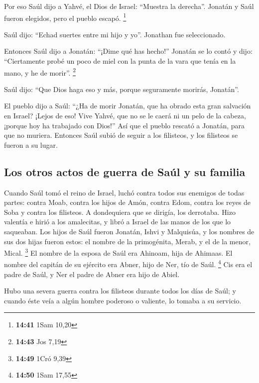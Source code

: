 \begin{paracol}{2}
 Por eso Saúl dijo a Yahvé, el Dios de Israel: ``Muestra
la derecha''. Jonatán y Saúl fueron elegidos, pero el pueblo escapó.
\footnote{\textbf{14:41} 1Sam 10,20}

 Saúl dijo: ``Echad suertes entre mi hijo y yo''.
Jonathan fue seleccionado.

 Entonces Saúl dijo a Jonatán: ``¡Dime qué has hecho!''
Jonatán se lo contó y dijo: ``Ciertamente probé un poco de miel con la
punta de la vara que tenía en la mano, y he de morir''. \footnote{\textbf{14:43}
  Jos 7,19}

 Saúl dijo: ``Que Dios haga eso y más, porque seguramente
morirás, Jonatán''.

 El pueblo dijo a Saúl: ``¿Ha de morir Jonatán, que ha
obrado esta gran salvación en Israel? ¡Lejos de eso! Vive Yahvé, que no
se le caerá ni un pelo de la cabeza, ¡porque hoy ha trabajado con
Dios!'' Así que el pueblo rescató a Jonatán, para que no muriera.
 Entonces Saúl subió de seguir a los filisteos, y los
filisteos se fueron a su lugar.

\hypertarget{los-otros-actos-de-guerra-de-sauxfal-y-su-familia}{%
\subsection{Los otros actos de guerra de Saúl y su
familia}\label{los-otros-actos-de-guerra-de-sauxfal-y-su-familia}}

 Cuando Saúl tomó el reino de Israel, luchó contra todos
sus enemigos de todas partes: contra Moab, contra los hijos de Amón,
contra Edom, contra los reyes de Soba y contra los filisteos. A
dondequiera que se dirigía, los derrotaba.  Hizo valentía
e hirió a los amalecitas, y libró a Israel de las manos de los que lo
saqueaban.  Los hijos de Saúl fueron Jonatán, Ishvi y
Malquisúa, y los nombres de sus dos hijas fueron estos: el nombre de la
primogénita, Merab, y el de la menor, Mical. \footnote{\textbf{14:49}
  1Cró 9,39}  El nombre de la esposa de Saúl era Ahinoam,
hija de Ahimaas. El nombre del capitán de su ejército era Abner, hijo de
Ner, tío de Saúl. \footnote{\textbf{14:50} 1Sam 17,55} 
Cis era el padre de Saúl, y Ner el padre de Abner era hijo de Abiel.

 Hubo una severa guerra contra los filisteos durante
todos los días de Saúl; y cuando éste veía a algún hombre poderoso o
valiente, lo tomaba a su servicio.


\end{paracol}
